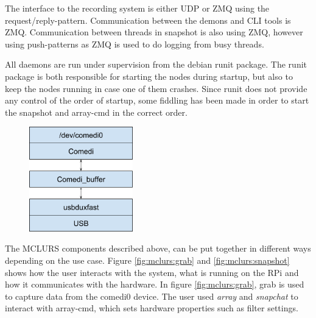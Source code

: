 
The interface to the recording system is either UDP or ZMQ using the request/reply-pattern. Communication between the demons and CLI tools is ZMQ. Communication between threads in snapshot is also using ZMQ, however using push-patterns as ZMQ is used to do logging from busy threads.

All daemons are run under supervision from the debian runit package. The runit package is both responsible for starting the nodes during startup, but also to keep the nodes running in case one of them crashes. Since runit does not provide any control of the order of startup, some fiddling has been made in order to start the snapshot and array-cmd in the correct order.  


 \label{sec:existingsystem:software:kernelmodule}

\begin{figure}[h!]
	\centering
	\includegraphics[width=0.4\textwidth]{figures/mclurs_comedi}
\end{figure}

 \label{sc:existingsystem:setup}
The MCLURS components described above, can be put together in different ways depending on the use case. Figure \ref{fig:mclurs:grab} and \ref{fig:mclurs:snapshot} shows how the user interacts with the system, what is running on the \ac{RPi} and how it communicates with the hardware. In figure \ref{fig:mclurs:grab}, grab is used to capture data from the comedi0 device. The user used \textit{array} and \textit{snapchat} to interact with array-cmd, which sets hardware properties such as filter settings.

